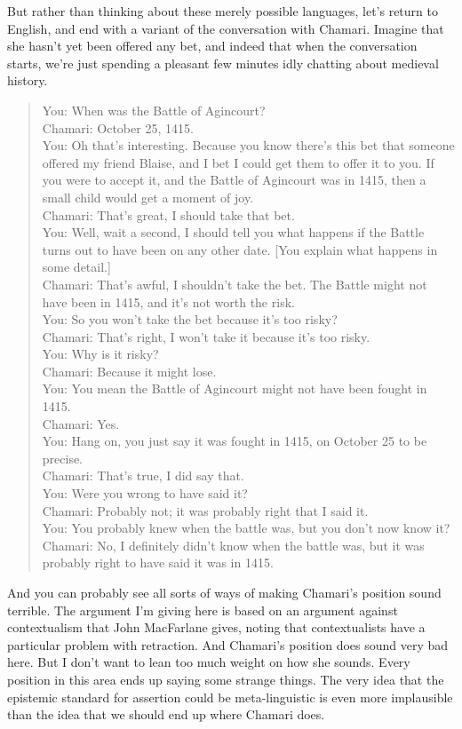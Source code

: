 \documentclass[
  11pt,
]{book}
\begin{document}
But rather than thinking about these merely possible languages, let's return to English, and end with a variant of the conversation with Chamari. Imagine that she hasn't yet been offered any bet, and indeed that when the conversation starts, we're just spending a pleasant few minutes idly chatting about medieval history.

\begin{quote}
You: When was the Battle of Agincourt?\\
Chamari: October 25, 1415.\\
You: Oh that's interesting. Because you know there's this bet that someone offered my friend Blaise, and I bet I could get them to offer it to you. If you were to accept it, and the Battle of Agincourt was in 1415, then a small child would get a moment of joy.\\
Chamari: That's great, I should take that bet.\\
You: Well, wait a second, I should tell you what happens if the Battle turns out to have been on any other date. {[}You explain what happens in some detail.{]}\\
Chamari: That's awful, I shouldn't take the bet. The Battle might not have been in 1415, and it's not worth the risk.\\
You: So you won't take the bet because it's too risky?\\
Chamari: That's right, I won't take it because it's too risky.\\
You: Why is it risky?\\
Chamari: Because it might lose.\\
You: You mean the Battle of Agincourt might not have been fought in 1415.\\
Chamari: Yes.\\
You: Hang on, you just say it was fought in 1415, on October 25 to be precise.\\
Chamari: That's true, I did say that.\\
You: Were you wrong to have said it?\\
Chamari: Probably not; it was probably right that I said it.\\
You: You probably knew when the battle was, but you don't now know it?\\
Chamari: No, I definitely didn't know when the battle was, but it was probably right to have said it was in 1415.
\end{quote}

And you can probably see all sorts of ways of making Chamari's position sound terrible. The argument I'm giving here is based on an argument against contextualism that John MacFarlane \citeyearpar{MacFarlane2005-Knowledge} gives, noting that contextualists have a particular problem with retraction. And Chamari's position does sound very bad here. But I don't want to lean too much weight on how she sounds. Every position in this area ends up saying some strange things. The very idea that the epistemic standard for assertion could be meta-linguistic is even more implausible than the idea that we should end up where Chamari does.
\end{document}
